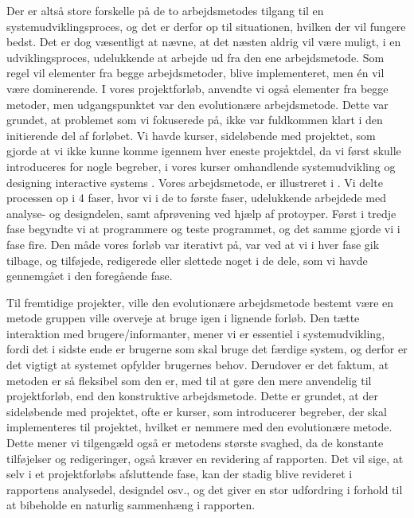 Der er altså store forskelle på de to arbejdsmetodes tilgang til en systemudviklingsproces, og det er derfor op til situationen, hvilken der vil fungere bedst. Det er dog væsentligt at nævne, at det næsten aldrig vil være muligt, i en udviklingsproces, udelukkende at arbejde ud fra den ene arbejdsmetode. Som regel vil elementer fra begge arbejdsmetoder, blive implementeret, men én vil være dominerende. I vores projektforløb, anvendte vi også elementer fra begge metoder, men udgangspunktet var den evolutionære arbejdsmetode. Dette var grundet, at problemet som vi fokuserede på, ikke var fuldkommen klart i den initierende del af forløbet. Vi havde kurser, sideløbende med projektet, som gjorde at vi ikke kunne komme igennem hver eneste projektdel, da vi først skulle introduceres for nogle begreber, i vores kurser omhandlende systemudvikling \cite{ooad} og designing interactive systems \cite{deb}. Vores arbejdsmetode, er illustreret i . Vi delte processen op i 4 faser, hvor vi i de to første faser, udelukkende arbejdede med analyse- og designdelen, samt afprøvening ved hjælp af protoyper. Først i tredje fase begyndte vi at programmere og teste programmet, og det samme gjorde vi i fase fire. Den måde vores forløb var iterativt på, var ved at vi i hver fase gik tilbage, og tilføjede, redigerede eller slettede noget i de dele, som vi havde gennemgået i den foregående fase.

Til fremtidige projekter, ville den evolutionære arbejdsmetode bestemt være en metode gruppen ville overveje at bruge igen i lignende forløb. Den tætte interaktion med brugere/informanter, mener vi er essentiel i systemudvikling, fordi det i sidste ende er brugerne som skal bruge det færdige system, og derfor er det vigtigt at systemet opfylder brugernes behov. Derudover er det faktum, at metoden er så fleksibel som den er, med til at gøre den mere anvendelig til projektforløb, end den konstruktive arbejdsmetode. Dette er grundet, at der sideløbende med projektet, ofte er kurser, som introducerer begreber, der skal implementeres til projektet, hvilket er nemmere med den evolutionære metode. Dette mener vi tilgengæld også er metodens største svaghed, da de konstante tilføjelser og redigeringer, også kræver en revidering af rapporten. Det vil sige, at selv i et projektforløbs afsluttende fase, kan der stadig blive revideret i rapportens analysedel, designdel osv., og det giver en stor udfordring i forhold til at bibeholde en naturlig sammenhæng i rapporten. 
 

